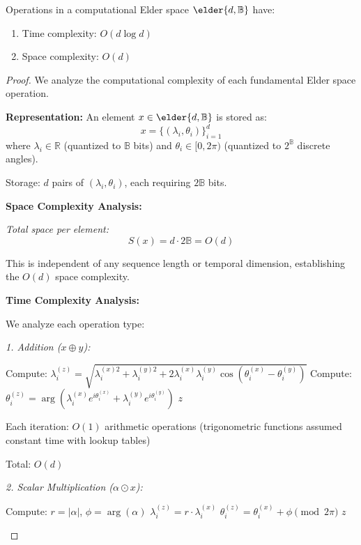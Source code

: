 \begin{theorem}
\label{thm:complexity_bounds}
Operations in a computational Elder space $\elder{d, \mathbb{B}}$ have:
\begin{enumerate}
    \item Time complexity: $O(d \log d)$
    \item Space complexity: $O(d)$
\end{enumerate}
\end{theorem}

\begin{proof}
We analyze the computational complexity of each fundamental Elder space operation.

\textbf{Representation:}
An element $x \in \elder{d, \mathbb{B}}$ is stored as:
$$x = \{(\lambda_i, \theta_i)\}_{i=1}^{d}$$
where $\lambda_i \in \mathbb{R}$ (quantized to $\mathbb{B}$ bits) and $\theta_i \in [0, 2\pi)$ (quantized to $2^{\mathbb{B}}$ discrete angles).

Storage: $d$ pairs of $(\lambda_i, \theta_i)$, each requiring $2\mathbb{B}$ bits.

\textbf{Space Complexity Analysis:}

\textit{Total space per element:}
$$S(x) = d \cdot 2\mathbb{B} = O(d)$$

This is independent of any sequence length or temporal dimension, establishing the $O(d)$ space complexity.

\textbf{Time Complexity Analysis:}

We analyze each operation type:

\textit{1. Addition ($x \oplus y$):}
\begin{algorithmic}[1]
        \State Compute: $\lambda_i^{(z)} = \sqrt{\lambda_i^{(x)2} + \lambda_i^{(y)2} + 2\lambda_i^{(x)}\lambda_i^{(y)}\cos(\theta_i^{(x)} - \theta_i^{(y)})}$
        \State Compute: $\theta_i^{(z)} = \arg(\lambda_i^{(x)}e^{i\theta_i^{(x)}} + \lambda_i^{(y)}e^{i\theta_i^{(y)}})$
    \EndFor
    \State \Return $z$
\EndProcedure
\end{algorithmic}

Each iteration: $O(1)$ arithmetic operations (trigonometric functions assumed constant time with lookup tables)

Total: $O(d)$

\textit{2. Scalar Multiplication ($\alpha \odot x$):}
\begin{algorithmic}[1]
    \State Compute: $r = |\alpha|$, $\phi = \arg(\alpha)$
        \State $\lambda_i^{(z)} = r \cdot \lambda_i^{(x)}$
        \State $\theta_i^{(z)} = \theta_i^{(x)} + \phi \pmod{2\pi}$
    \EndFor
    \State \Return $z$
\EndProcedure
\end{algorithmic}


\end{proof}
